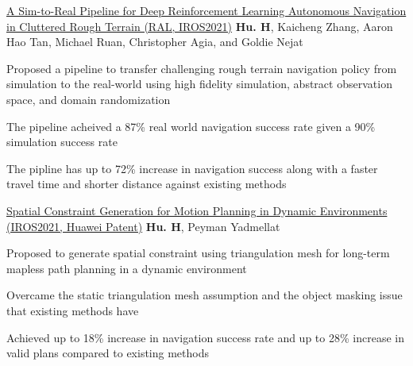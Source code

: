 


\begin{cventries}
  \cvpublicationentrysimple
    {\href{https://ieeexplore.ieee.org/document/9468918}{A Sim-to-Real Pipeline for Deep Reinforcement Learning Autonomous Navigation in Cluttered Rough Terrain (RAL, IROS2021)}} %
    {\textbf{Hu. H}, Kaicheng Zhang, Aaron Hao Tan, Michael Ruan, Christopher Agia, and Goldie Nejat} %
    {
    \begin{cvitems}
      \item{
        Proposed a pipeline to transfer challenging rough terrain navigation policy from simulation to the real-world using high fidelity simulation, abstract observation space, and domain randomization
      }
      \item{
        The pipeline acheived a 87\% real world navigation success rate given a 90\% simulation success rate
			}
      \item{
				The pipline has up to 72\% increase in navigation success along with a faster travel time and shorter distance against existing methods
      }
    \end{cvitems}
    }
  \cvpublicationentrysimple
    {\href{https://arxiv.org/abs/2110.14786}{Spatial Constraint Generation for Motion Planning in Dynamic Environments (IROS2021, Huawei Patent)}} %
    {\textbf{Hu. H}, Peyman Yadmellat} %
    {
    \begin{cvitems}
      \item {Proposed to generate spatial constraint using triangulation mesh for long-term mapless path planning in a dynamic environment}
      \item {Overcame the static triangulation mesh assumption and the object masking issue that existing methods have
      }
      \item {Achieved up to 18\% increase in navigation success rate and up to 28\% increase in valid plans compared to existing methods}

\end{cvitems}}
\end{cventries}
